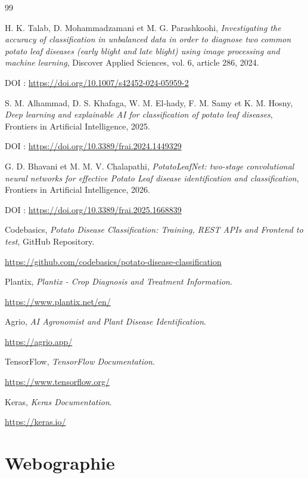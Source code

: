 \documentclass[12pt,a4paper,oneside]{report}
\begin{document}
\begin{thebibliography}{99}

H. K. Talab, D. Mohammadzamani et M. G. Parashkoohi,
\textit{Investigating the accuracy of classification in
unbalanced data in order to diagnose two common potato
leaf diseases (early blight and late blight) using image
processing and machine learning},
Discover Applied Sciences, vol. 6, article 286, 2024.

DOI :
\url{https://doi.org/10.1007/s42452-024-05959-2}

S. M. Alhammad, D. S. Khafaga, W. M. El-hady,
F. M. Samy et K. M. Hosny,
\textit{Deep learning and explainable AI for classification
of potato leaf diseases},
Frontiers in Artificial Intelligence, 2025.

DOI :
\url{https://doi.org/10.3389/frai.2024.1449329}

G. D. Bhavani et M. M. V. Chalapathi,
\textit{PotatoLeafNet: two-stage convolutional neural
networks for effective Potato Leaf disease identification
and classification},
Frontiers in Artificial Intelligence, 2026.

DOI :
\url{https://doi.org/10.3389/frai.2025.1668839}

Codebasics,
\textit{Potato Disease Classification: Training, REST APIs
and Frontend to test},
GitHub Repository.

\url{https://github.com/codebasics/potato-disease-classification}

Plantix,
\textit{Plantix - Crop Diagnosis and Treatment Information}.

\url{https://www.plantix.net/en/}

Agrio,
\textit{AI Agronomist and Plant Disease Identification}.

\url{https://agrio.app/}

TensorFlow,
\textit{TensorFlow Documentation}.

\url{https://www.tensorflow.org/}

Keras,
\textit{Keras Documentation}.

\url{https://keras.io/}

\end{thebibliography}


\chapter*{Webographie}
\end{document}
